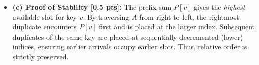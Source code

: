 \documentclass[11pt,a4paper]{article}
\begin{document}
\begin{solutionbox}
\begin{itemize}
\begin{itemize}
        \item $j = 3, A[3] = 8$: Target index $= P[8] - 1 = 7 - 1 = 6$. Set $B[6] = 8$; decrement $P[8] = 6$.
        \item $j = 2, A[2] = 2_b$: Target index $= P[2] - 1 = 3 - 1 = 2$. Set $B[2] = 2_b$; decrement $P[2] = 2$.
        \item $j = 1, A[1] = 2_a$: Target index $= P[2] - 1 = 2 - 1 = 1$. Set $B[1] = 2_a$; decrement $P[2] = 1$.
        \item $j = 0, A[0] = 4$: Target index $= P[4] - 1 = 6 - 1 = 5$. Set $B[5] = 4$; decrement $P[4] = 5$.
    \end{itemize}
    \textbf{Final Array:} $B = [1, 2_a, 2_b, 3_a, 3_b, 4, 8]$.
    \item \textbf{(c) Proof of Stability [0.5 pts]:}
    The prefix sum $P[v]$ gives the \textit{highest} available slot for key $v$. By traversing $A$ from right to left, the rightmost duplicate encounters $P[v]$ first and is placed at the larger index. Subsequent duplicates of the same key are placed at sequentially decremented (lower) indices, ensuring earlier arrivals occupy earlier slots. Thus, relative order is strictly preserved.
\end{itemize}
\end{solutionbox}

\vspace{0.4em}
\end{document}
